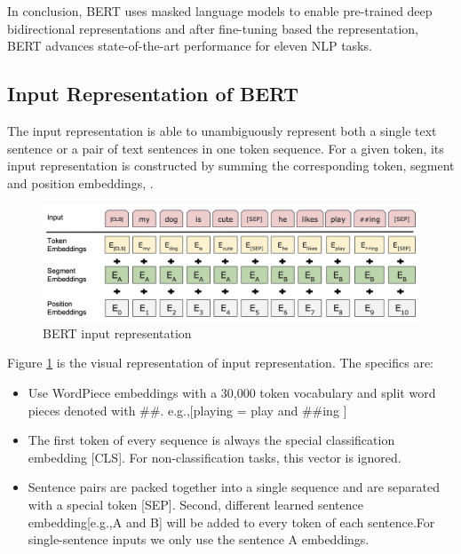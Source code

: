 \documentclass[]{krantz}
\begin{document}
In conclusion, BERT uses masked language models to enable pre-trained deep bidirectional representations and after fine-tuning based the representation, BERT advances state-of-the-art performance for eleven NLP tasks.

\hypertarget{input-representation-of-bert}{%
\subsection{Input Representation of BERT}\label{input-representation-of-bert}}

The input representation is able to unambiguously represent both a single text sentence or a pair of text sentences in one token sequence. For a given token, its input representation is constructed by summing the corresponding token, segment and position embeddings, \citet{bert}.

\begin{figure}

{\centering \includegraphics[width=0.8\linewidth]{figures/02-03-transfer-learning-for-nlp/bert_input_representation} 

}

\caption{BERT input representation}\label{fig:ch02-03-figure02}
\end{figure}

Figure \ref{fig:ch02-03-figure02} is the visual representation of input representation. The specifics are:

\begin{itemize}
\item
  Use WordPiece embeddings \citet{wu2016google} with a 30,000 token vocabulary and split word pieces denoted with \#\#. e.g.,{[}playing = play and \#\#ing {]}
\item
  The first token of every sequence is always the special classification embedding {[}CLS{]}. For non-classification tasks, this vector is ignored.
\item
  Sentence pairs are packed together into a single sequence and are separated with a special token {[}SEP{]}. Second, different learned sentence embedding{[}e.g.,A and B{]} will be added to every token of each sentence.For single-sentence inputs we only use the sentence A embeddings.
\end{itemize}
\end{document}
